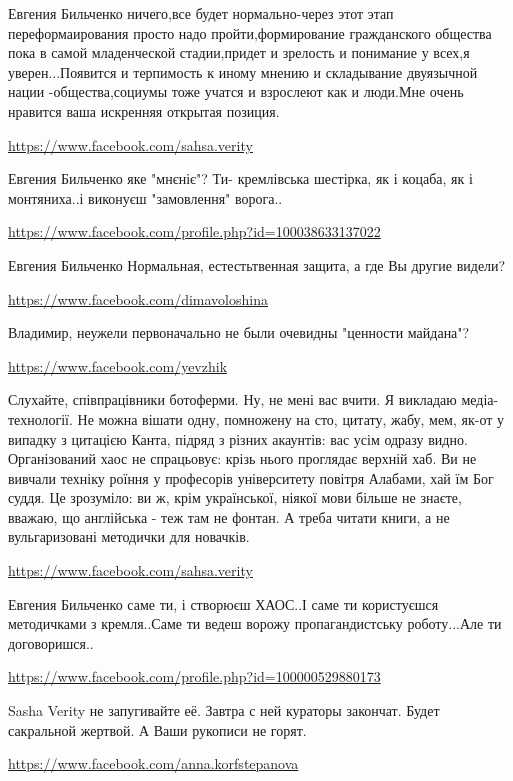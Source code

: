 \documentclass[a4paper,11pt]{extreport}
\begin{document}
\begin{itemize}
\begin{itemize}
Евгения Бильченко ничего,все будет нормально-через этот этап переформаирования просто надо пройти,формирование гражданского общества пока в самой младенческой стадии,придет и зрелость и понимание у всех,я уверен...Появится и терпимость к иному мнению и складывание двуязычной нации -общества,социумы тоже учатся и взрослеют как и люди.Мне очень нравится ваша искренняя открытая позиция.

\url{https://www.facebook.com/sahsa.verity}

Евгения Бильченко яке "мнєніє"? Ти- кремлівська шестірка, як і коцаба, як і монтяниха..і виконуєш "замовлення" ворога..

\url{https://www.facebook.com/profile.php?id=100038633137022}

Евгения Бильченко Нормальная, естестьтвенная защита, а где Вы другие видели?

\url{https://www.facebook.com/dimavoloshina}

Владимир, неужели первоначально не были очевидны "ценности майдана"?

\end{itemize}
\url{https://www.facebook.com/yevzhik}

Слухайте, співпрацівники ботоферми. Ну, не мені вас вчити. Я викладаю медіа-технології. Не можна вішати одну, помножену на сто, цитату, жабу, мем, як-от у випадку з цитацією Канта, підряд з різних акаунтів: вас усім одразу видно. Організований хаос не спрацьовує: крізь нього проглядає верхній хаб. Ви не вивчали техніку роїння у професорів університету повітря Алабами, хай їм Бог суддя. Це зрозуміло: ви ж, крім української, ніякої мови більше не знаєте, вважаю, що англійська - теж там не фонтан. А треба читати книги, а не вульгаризовані методички для новачків.

\begin{itemize}
\url{https://www.facebook.com/sahsa.verity}

Евгения Бильченко саме ти, і створюєш ХАОС..І саме ти користуєшся методичками з кремля..Саме ти ведеш ворожу пропагандистську роботу...Але ти договоришся..

\url{https://www.facebook.com/profile.php?id=100000529880173}

Sasha Verity не запугивайте её. Завтра с ней кураторы закончат. Будет сакральной жертвой. А Ваши рукописи не горят.

\url{https://www.facebook.com/anna.korfstepanova}


\end{itemize}
\end{itemize}
\end{document}
